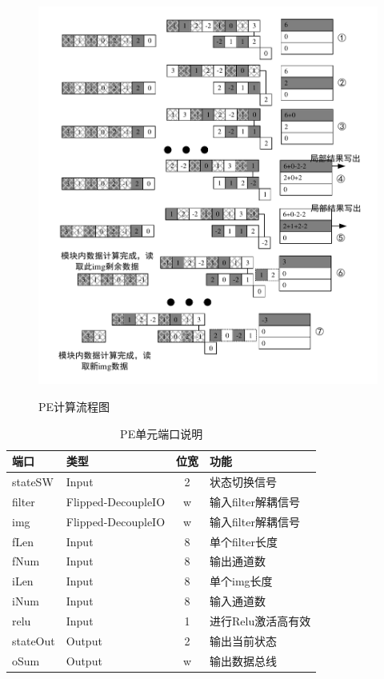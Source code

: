 \begin{figure}[h]
    \centering
    \includegraphics[scale=0.8]{../pdf/pe_cal.pdf}\\
    \caption{PE计算流程图}
    \label{pe_cal}
\end{figure}
\begin{table}[h] %
    \centering
    \caption{PE单元端口说明} %
    \begin{tabular}{l|l|c|l} %
    \hline  
    \hline  
    端口 & 类型 & 位宽 & 功能 \\ %
    \hline %
    stateSW & Input & 2 & 状态切换信号 \\
    \hline  
    filter & Flipped-DecoupleIO & w & 输入filter解耦信号 \\
    \hline  
    img & Flipped-DecoupleIO & w & 输入filter解耦信号 \\
    \hline  
    fLen & Input & 8 & 单个filter长度 \\
    \hline  
    fNum & Input & 8 & 输出通道数 \\
    \hline  
    iLen & Input & 8 & 单个img长度 \\
    \hline  
    iNum & Input & 8 & 输入通道数 \\
    \hline  
    relu & Input & 1 & 进行Relu激活高有效 \\
    \hline  
    stateOut & Output & 2 & 输出当前状态 \\
    \hline  
    oSum & Output & w & 输出数据总线 \\
    \hline  
    \hline  
    \end{tabular}  
\end{table}  

